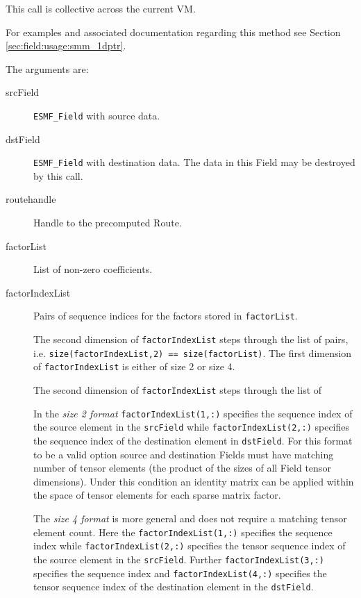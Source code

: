    This call is collective across the current VM.  
   
   For examples and associated documentation regarding this method see Section
   \ref{sec:field:usage:smm_1dptr}. 
   
   The arguments are:
  
   \begin{description}
  
   \item [srcField]
         {\tt ESMF\_Field} with source data.
  
   \item [dstField]
         {\tt ESMF\_Field} with destination data. The data in this Field may be
       destroyed by this call.
  
   \item [routehandle]
         Handle to the precomputed Route.
  
   \item [factorList]
         List of non-zero coefficients.
  
   \item [factorIndexList]
       Pairs of sequence indices for the factors stored in {\tt factorList}.
  
       \begin{sloppypar}
       The second dimension of {\tt factorIndexList} steps through the list of
       pairs, i.e. {\tt size(factorIndexList,2) == size(factorList)}. The first
       dimension of {\tt factorIndexList} is either of size 2 or size 4.
       \end{sloppypar}
       The second dimension of {\tt factorIndexList} steps through the list of
  
       In the {\em size 2 format} {\tt factorIndexList(1,:)} specifies the
       sequence index of the source element in the {\tt srcField} while
       {\tt factorIndexList(2,:)} specifies the sequence index of the
       destination element in {\tt dstField}. For this format to be a valid
       option source and destination Fields must have matching number of
       tensor elements (the product of the sizes of all Field tensor dimensions).
       Under this condition an identity matrix can be applied within the space of
       tensor elements for each sparse matrix factor.
  
       \begin{sloppypar}
       The {\em size 4 format} is more general and does not require a matching
       tensor element count. Here the {\tt factorIndexList(1,:)} specifies the
       sequence index while {\tt factorIndexList(2,:)} specifies the tensor
       sequence index of the source element in the {\tt srcField}. Further
       {\tt factorIndexList(3,:)} specifies the sequence index and
       {\tt factorIndexList(4,:)} specifies the tensor sequence index of the 
       destination element in the {\tt dstField}.
       \end{sloppypar}
  

\end{description}

